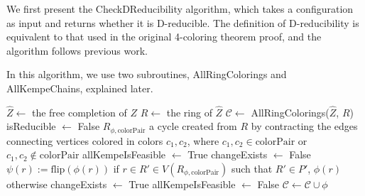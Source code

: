 \documentclass[main.tex]{subfiles}
\begin{document}
We first present the CheckDReducibility algorithm, which takes a configuration as input and returns whether it is D-reducible.
The definition of D-reducibility is equivalent to that used in the original 4-coloring theorem proof, and the algorithm follows previous work.

In this algorithm, we use two subroutines, AllRingColorings and AllKempeChains, explained later.

\begin{algorithm}[H]
    \caption{CheckDReducibility($(Z, \delta)$)}
    \label{alg:check-red_a}
    \begin{algorithmic}[1]
        \State $\hat{Z} \gets$ the free completion of $Z$
        \State $R \gets$ the ring of $\hat{Z}$
        \State $\mathcal{C} \gets $ AllRingColorings($\hat{Z}$, $R$)
        \State isReducible $\gets$ False
        \Repeat
                    \State $R_{\phi,\mathrm{colorPair}}$ a cycle created from $R$ by contracting the edges connecting vertices colored in colors $c_1, c_2$, where $c_1,c_2 \in \mathrm{colorPair}$ or $c_1,c_2 \notin \mathrm{colorPair}$
                    \State allKempeIsFeasible $\gets$ True
                        \State changeExists $\gets$ False
                            \State $\psi(r) := \mathrm{flip}(\phi(r))$ if $r \in R' \in V(R_{\phi, \mathrm{colorPair}})$ such that $R' \in P'$, $\phi(r)$ otherwise
                                \State changeExists $\gets$ True
                            \EndIf
                        \EndFor
                            \State allKempeIsFeasible $\gets$ False
                        \EndIf
                    \EndFor
                        \State $\mathcal{C} \gets \mathcal{C} \cup \phi$
                        \Break
                    \EndIf
                \EndFor            
            \EndFor
        \EndIf
        
    \end{algorithmic}
\end{algorithm}
\end{document}

